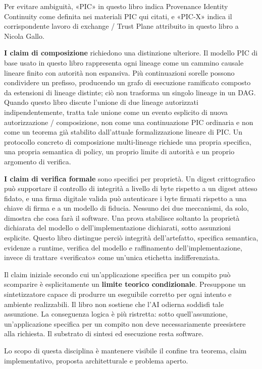 \documentclass[10pt,oneside,openany]{book}
\begin{document}
Per evitare ambiguità, «PIC» in questo libro indica Provenance Identity Continuity come definita nei materiali PIC qui citati, e «PIC-X» indica il corrispondente lavoro di exchange / Trust Plane attribuito in questo libro a Nicola Gallo.

\textbf{I claim di composizione} richiedono una distinzione ulteriore. Il modello PIC di base usato in questo libro rappresenta ogni lineage come un cammino causale lineare finito con autorità non espansiva. Più continuazioni sorelle possono condividere un prefisso, producendo un grafo di esecuzione ramificato composto da estensioni di lineage distinte; ciò non trasforma un singolo lineage in un DAG. Quando questo libro discute l'unione di due lineage autorizzati indipendentemente, tratta tale unione come un evento esplicito di nuova autorizzazione / composizione, non come una continuazione PIC ordinaria e non come un teorema già stabilito dall'attuale formalizzazione lineare di PIC. Un protocollo concreto di composizione multi-lineage richiede una propria specifica, una propria semantica di policy, un proprio limite di autorità e un proprio argomento di verifica.

\textbf{I claim di verifica formale} sono specifici per proprietà. Un digest crittografico può supportare il controllo di integrità a livello di byte rispetto a un digest atteso fidato, e una firma digitale valida può autenticare i byte firmati rispetto a una chiave di firma e a un modello di fiducia. Nessuno dei due meccanismi, da solo, dimostra che cosa farà il software. Una prova stabilisce soltanto la proprietà dichiarata del modello o dell'implementazione dichiarati, sotto assunzioni esplicite. Questo libro distingue perciò integrità dell'artefatto, specifica semantica, evidenze a runtime, verifica del modello e raffinamento dell'implementazione, invece di trattare «verificato» come un'unica etichetta indifferenziata.

Il claim iniziale secondo cui un'applicazione specifica per un compito può scomparire è esplicitamente un \textbf{limite teorico condizionale}. Presuppone un sintetizzatore capace di produrre un eseguibile corretto per ogni intento e ambiente realizzabili. Il libro non sostiene che l'AI odierna soddisfi tale assunzione. La conseguenza logica è più ristretta: sotto quell'assunzione, un'applicazione specifica per un compito non deve necessariamente preesistere alla richiesta. Il substrato di sintesi ed esecuzione resta software.

Lo scopo di questa disciplina è mantenere visibile il confine tra teorema, claim implementativo, proposta architetturale e problema aperto.
\end{document}
